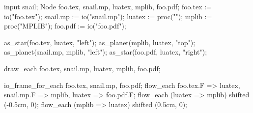 \usemodule[zhfonts]
\startMPpage
input snail;
Node foo.tex, snail.mp, luatex, mplib, foo.pdf;
foo.tex := io("foo.tex");
snail.mp := io("snail.mp");
luatex := proc("\LUATEX");
mplib := proc("MPLIB");
foo.pdf := io("foo.pdf");

as_star(foo.tex, luatex, "left");
as_planet(mplib, luatex, "top");
as_planet(snail.mp, mplib, "left");
as_star(foo.pdf, luatex, "right");

draw_each foo.tex, snail.mp, luatex, mplib, foo.pdf;

io_frame_for_each foo.tex, snail.mp, foo.pdf;
flow_each foo.tex.F => luatex, snail.mp.F => mplib, luatex => foo.pdf.F;
flow_each (luatex => mplib) shifted (-0.5cm, 0);
flow_each (mplib => luatex) shifted (0.5cm, 0);
\stopMPpage
